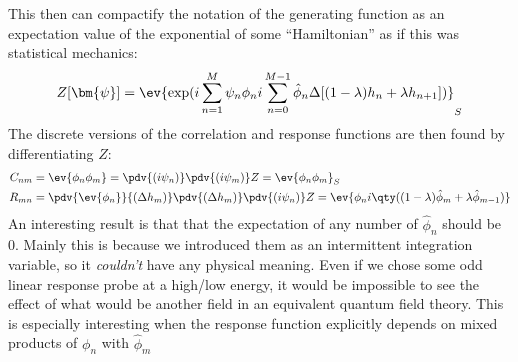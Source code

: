 \documentclass[12pt]{article}
\def\bpsi{\bm{\psi}}
\begin{document}
This then can compactify the notation of the generating function as an expectation value of the exponential of some ``Hamiltonian'' as if this was statistical mechanics:
\begin{align*}
  Z[\bpsi]=\ev{\exp(i\sum_{n=1}^M\psi_n\phi_n
    i\sum_{n=0}^{M-1}\hat{\phi}_n\Delta[(1-\lambda)h_n+\lambda h_{n+1}])}_S
\end{align*}
The discrete versions of the correlation and response functions are then found by differentiating $Z$:
\begin{align*}
  C_{nm}&=\ev{\phi_n\phi_m}=\pdv{(i\psi_n)}\pdv{(i\psi_m)}Z=
  \ev{\phi_n\phi_m}_S\\
  R_{mn}&=\pdv{\ev{\phi_n}}{(\Delta h_m)}
  \pdv{(\Delta h_m)}\pdv{(i\psi_n)}Z
  =\ev{\phi_n i\qty((1-\lambda)\hat{\phi}_m+\lambda\hat{\phi}_{m-1})}
\end{align*}
An interesting result is that that the expectation of any number of $\hat{\phi}_n$ should be $0$. Mainly this is because we introduced them as an intermittent integration variable, so it \emph{couldn't} have any physical meaning. Even if we chose some odd linear response probe at a high/low energy, it would be impossible to see the effect of what would be another field in an equivalent quantum field theory. This is especially interesting when the response function explicitly depends on mixed products of $\phi_n$ with $\hat{\phi}_m$
\end{document}
